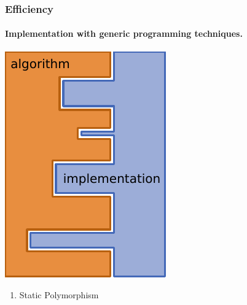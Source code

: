 \documentclass[ignorenonframetext,11pt]{beamer}
\theoremstyle{definition}
\begin{document}
\begin{frame}
  \frametitle{Efficiency}

  \framesubtitle<presentation>{Implementation with generic programming
    techniques.}


  \begin{minipage}{0.35\textwidth}
    \begin{center}
      \includegraphics[width={\textwidth}]{intro/generic}
    \end{center}
  \end{minipage}
  \begin{minipage}{0.65\textwidth-1ex}
      \begin{enumerate}
      \item Static Polymorphism
        \begin{itemize}

\end{itemize}
\end{enumerate}
\end{minipage}
\end{frame}
\end{document}
